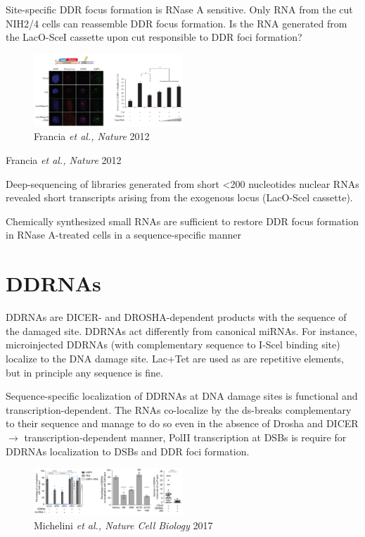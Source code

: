 Site-specific DDR focus formation is RNase A sensitive. Only RNA from the cut NIH2/4 cells can reassemble DDR focus formation. Is the RNA generated from the LacO-SceI cassette upon cut responsible to DDR foci formation?

\begin{figure}
\centering
\includegraphics[width=0.5\textwidth]{Screen_Shot_2022-12-07_at_09-03-41.png}
\caption{Francia \emph{et al., Nature} 2012}
\end{figure}

Francia \emph{et al., Nature} 2012

Deep-sequencing of libraries generated from short \textless200 nucleotides nuclear RNAs revealed short transcripts arising from the exogenous locus (LacO-Scel cassette).

Chemically synthesized small RNAs are sufficient to restore DDR focus formation in RNase A-treated cells in a sequence-specific manner

\hypertarget{ddrnas}{%
\section{DDRNAs}\label{ddrnas}}

DDRNAs are DICER- and DROSHA-dependent products with the sequence of the damaged site. DDRNAs act differently from canonical miRNAs. For instance, microinjected DDRNAs (with complementary sequence to I-Scel binding site) localize to the DNA damage site. Lac+Tet are used as are repetitive elements, but in principle any sequence is fine.

Sequence-specific localization of DDRNAs at DNA damage sites is functional and transcription-dependent. The RNAs co-localize by the ds-breaks complementary to their sequence and manage to do so even in the absence of Drosha and DICER $\rightarrow$ transcription-dependent manner, PolII transcription at DSBs is require for DDRNAs localization to DSBs and DDR foci formation.

\begin{figure}
\centering
\includegraphics[width=0.5\textwidth]{Screen_Shot_2022-12-07_at_09-15-58.png}
\caption{Michelini \emph{et al., Nature Cell Biology} 2017}
\end{figure}

